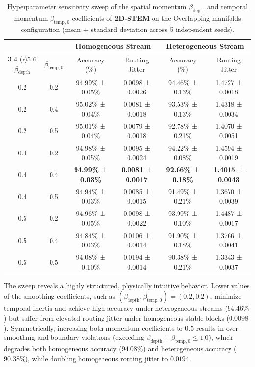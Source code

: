 \begin{table}[h]
\caption{Hyperparameter sensitivity sweep of the spatial momentum $\beta_{\text{depth}}$ and temporal momentum $\beta_{\text{temp}, 0}$ coefficients of \textbf{2D-STEM} on the Overlapping manifolds configuration (mean $\pm$ standard deviation across 5 independent seeds).}
\label{tab:beta_ablation}
\vskip 0.15in
\begin{center}
\begin{small}
\begin{sc}
\begin{tabular}{cccccc}
\toprule
 & & \multicolumn{2}{c}{Homogeneous Stream} & \multicolumn{2}{c}{Heterogeneous Stream} \\
\cmidrule(r){3-4} \cmidrule(r){5-6}
$\beta_{\text{depth}}$ & $\beta_{\text{temp}, 0}$ & Accuracy (\%) & Routing Jitter & Accuracy (\%) & Routing Jitter \\
\midrule
0.2 & 0.2 & 94.99\% ± 0.05\% & 0.0098 ± 0.0026 & 94.46\% ± 0.13\% & 1.4727 ± 0.0018 \\
0.2 & 0.4 & 95.02\% ± 0.04\% & 0.0081 ± 0.0018 & 93.53\% ± 0.13\% & 1.4318 ± 0.0034 \\
0.2 & 0.5 & 95.01\% ± 0.04\% & 0.0079 ± 0.0018 & 92.78\% ± 0.21\% & 1.4070 ± 0.0051 \\
0.4 & 0.2 & 94.98\% ± 0.05\% & 0.0095 ± 0.0024 & 94.22\% ± 0.08\% & 1.4594 ± 0.0019 \\
0.4 & 0.4 & \textbf{94.99\% ± 0.03\%} & \textbf{0.0081 ± 0.0017} & \textbf{92.66\% ± 0.18\%} & \textbf{1.4015 ± 0.0043} \\
0.4 & 0.5 & 94.94\% ± 0.03\% & 0.0085 ± 0.0015 & 91.49\% ± 0.21\% & 1.3670 ± 0.0039 \\
0.5 & 0.2 & 94.96\% ± 0.05\% & 0.0098 ± 0.0022 & 93.99\% ± 0.10\% & 1.4487 ± 0.0017 \\
0.5 & 0.4 & 94.84\% ± 0.03\% & 0.0106 ± 0.0014 & 91.90\% ± 0.18\% & 1.3766 ± 0.0041 \\
0.5 & 0.5 & 94.08\% ± 0.10\% & 0.0194 ± 0.0014 & 90.38\% ± 0.21\% & 1.3343 ± 0.0037 \\
\bottomrule
\end{tabular}
\end{sc}
\end{small}
\end{center}
\vskip -0.1in
\end{table}

The sweep reveals a highly structured, physically intuitive behavior. Lower values of the smoothing coefficients, such as $(\beta_{\text{depth}}, \beta_{\text{temp}, 0}) = (0.2, 0.2)$, minimize temporal inertia and achieve high accuracy under heterogeneous streams ($94.46\%$) but suffer from elevated routing jitter under homogeneous stable blocks ($0.0098$). Symmetrically, increasing both momentum coefficients to $0.5$ results in over-smoothing and boundary violations (exceeding $\beta_{\text{depth}} + \beta_{\text{temp}, 0} \le 1.0$), which degrades both homogeneous accuracy ($94.08\%$) and heterogeneous accuracy ($90.38\%$), while doubling homogeneous routing jitter to $0.0194$. 

